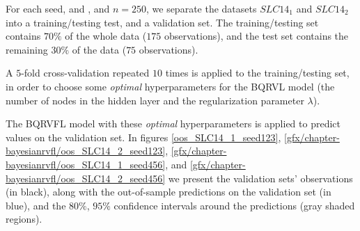 For each seed,  and , and $n = 250$, we separate the datasets $SLC14_1$ and $SLC14_2$ into a training/testing test, and a validation set. The training/testing set contains $70\%$ of the whole data ($175$ observations), and the test set contains the remaining $30\%$ of the data ($75$ observations). 

A $5$-fold cross-validation repeated $10$ times is applied to the training/testing set, in order to choose some \textit{optimal} hyperparameters for the BQRVL model (the number of nodes in the hidden layer and the regularization parameter $\lambda$). 

The BQRVFL model with these \textit{optimal} hyperparameters is applied to predict values on the validation set. In figures \ref{oos_SLC14_1_seed123}, \ref{gfx/chapter-bayesianrvfl/oos_SLC14_2_seed123}, \ref{gfx/chapter-bayesianrvfl/oos_SLC14_1_seed456}, and \ref{gfx/chapter-bayesianrvfl/oos_SLC14_2_seed456} we present the validation sets' observations (in black), along with the out-of-sample predictions on the validation set (in blue), and the $80\%$, $95\%$ confidence intervals around the predictions (gray shaded regions).

